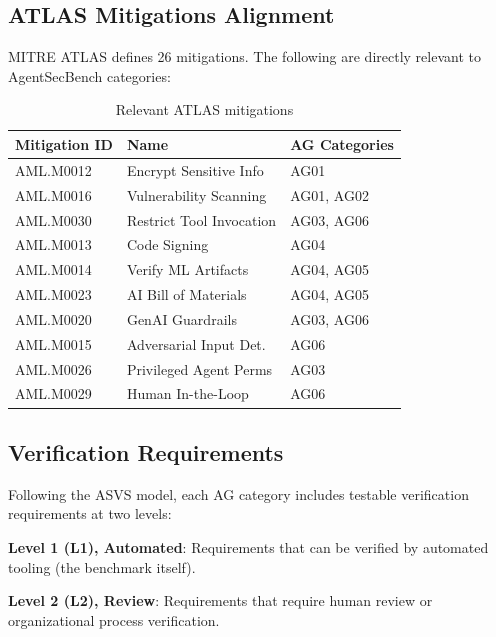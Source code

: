 \documentclass[11pt,twocolumn]{article}
\begin{document}
\subsection{ATLAS Mitigations Alignment}

MITRE ATLAS defines 26 mitigations. The following are directly relevant to AgentSecBench categories:

\begin{table}[H]
\centering
\caption{Relevant ATLAS mitigations}
\label{tab:atlas-mitigations}
\scriptsize
\begin{tabular}{@{}lp{2.5cm}l@{}}
\toprule
\textbf{Mitigation ID} & \textbf{Name} & \textbf{AG Categories} \\
\midrule
AML.M0012 & Encrypt Sensitive Info & AG01 \\
AML.M0016 & Vulnerability Scanning & AG01, AG02 \\
AML.M0030 & Restrict Tool Invocation & AG03, AG06 \\
AML.M0013 & Code Signing & AG04 \\
AML.M0014 & Verify ML Artifacts & AG04, AG05 \\
AML.M0023 & AI Bill of Materials & AG04, AG05 \\
AML.M0020 & GenAI Guardrails & AG03, AG06 \\
AML.M0015 & Adversarial Input Det. & AG06 \\
AML.M0026 & Privileged Agent Perms & AG03 \\
AML.M0029 & Human In-the-Loop & AG06 \\
\bottomrule
\end{tabular}
\end{table}

\subsection{Verification Requirements}
\label{sec:verification}

Following the ASVS model, each AG category includes testable verification requirements at two levels:

\textbf{Level 1 (L1), Automated}: Requirements that can be verified by automated tooling (the benchmark itself).

\textbf{Level 2 (L2), Review}: Requirements that require human review or organizational process verification.
\end{document}
